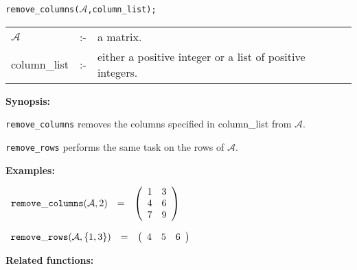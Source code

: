 
\hspace*{0.175in} {\tt remove\_columns($\mathcal{A}$,column\_list);}

\hspace*{0.1in}  
\begin{tabular}{l l l} 
$\mathcal{A}$   &:-& a matrix. \\
column\_list &:-& either a positive integer or a list of 
                  positive integers.
\end{tabular}

{\bf Synopsis:} %

\hspace*{0.175in} {\tt remove\_columns} removes the columns specified in
                column\_list from $\mathcal{A}$. 

\hspace*{0.175in} {\tt remove\_rows} performs the same task on the rows 
                of $\mathcal{A}$.

{\bf Examples:} 

\begin{flushleft}  
\hspace*{0.1in}
\begin{math}  
\begin{array}{ccc}
{\tt remove\_columns}(\mathcal{A},2) & = & 
        \left( \begin{array}{cc} 1 & 3 \\ 4 & 6 \\ 7 & 9  
 \end{array} \right) 
\end{array}
\end{math}  
\end{flushleft}

\vspace*{0.1in}

\begin{flushleft}  
\hspace*{0.1in}
\begin{math}  
\begin{array}{ccc}
{\tt remove\_rows}(\mathcal{A},\{1,3\}) & = & 
        \left( \begin{array}{ccc} 4 & 5 & 6
 \end{array} \right) 
\end{array}
\end{math}  
\end{flushleft}


{\bf Related functions:}

